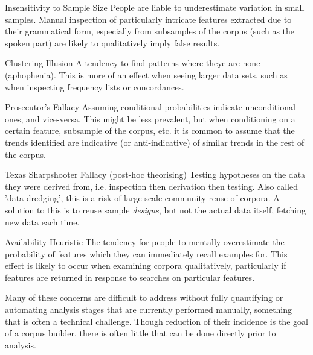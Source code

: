 \begin{itemizeTitle}
    \item[Insensitivity to Sample Size] People are liable to underestimate variation in small samples.  Manual inspection of particularly intricate features extracted due to their grammatical form, especially from subsamples of the corpus (such as the spoken part) are likely to qualitatively imply false results\cite{rabin2000inference}.

    \item[Clustering Illusion] A tendency to find patterns where theye are none (aphophenia).  This is more of an effect when seeing larger data sets, such as when inspecting frequency lists or concordances.

    \item[Prosecutor's Fallacy] Assuming conditional probabilities indicate unconditional ones, and vice-versa.  This might be less prevalent, but when conditioning on a certain feature, subsample of the corpus, etc. it is common to assume that the trends identified are indicative (or anti-indicative) of similar trends in the rest of the corpus.

    \item[Texas Sharpshooter Fallacy (post-hoc theorising)] Testing hypotheses on the data they were derived from, i.e. inspection then derivation then testing.  Also called 'data dredging', this is a risk of large-scale community reuse of corpora.  A solution to this is to reuse sample \textsl{designs}, but not the actual data itself, fetching new data each time.

    \item[Availability Heuristic] The tendency for people to mentally overestimate the probability of features which they can immediately recall examples for\cite{tversky1973availability,schafer2014focused}.  This effect is likely to occur when examining corpora qualitatively, particularly if features are returned in response to searches on particular features.
\end{itemizeTitle}

Many of these concerns are difficult to address without fully quantifying or automating analysis stages that are currently performed manually, something that is often a technical challenge.  Though reduction of their incidence is the goal of a corpus builder, there is often little that can be done directly prior to analysis.









